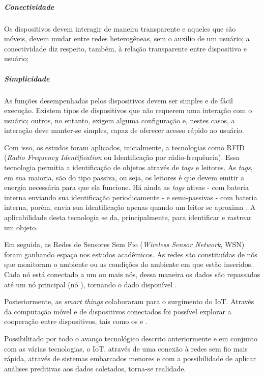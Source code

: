 \subparagraph{Conectividade} 

Os dispositivos devem interagir de maneira transparente
e aqueles que são móveis, devem mudar entre redes heterogêneas, sem o 
auxílio de um usuário; a conectividade diz respeito, também, à relação 
transparente entre dispositivo e usuário; 

\subparagraph{Simplicidade} 

As funções desempenhadas pelos dispositivos devem ser
simples e de fácil execução. Existem tipos de dispositivos que não requerem 
uma interação com o usuário; outros, no entanto, exigem alguma configuração e,
nestes casos, a interação deve manter-se simples, capaz de oferecer acesso
rápido ao usuário. 

Com isso, os estudos foram aplicados, inicialmente, a tecnologias como RFID
(\textit{Radio Frequency Identification} ou Identificação por
rádio-frequência).  Essa tecnologia permitia a identificação de objetos através
de \textit{tags} e leitores. As \textit{tags}, em sua maioria, são do tipo
passiva, ou seja, os leitores é que devem emitir a energia necessária para que
ela funcione. Há ainda as \textit{tags} ativas - com bateria interna enviando
sua identificação periodicamente - e semi-passivas - com bateria interna,
porém, envia sua identificação apenas quando um leitor se aproxima
\cite{want2006introduction}. A aplicabilidade desta tecnologia se da, 
principalmente, para identificar e rastrear um objeto.


Em seguida, as Redes de Sensores Sem Fio (\textit{Wireless Sensor Network}, WSN)
foram ganhando espaço nos estudos acadêmicos. As redes são constituídas de nós
que monitoram o ambiente ou as condições do ambiente em que estão inseridos.
Cada nó está conectado a um ou mais nós, dessa maneira os dados são repassados
até um nó principal (nó \gateway), tornando o dado disponível
\cite{lewis2004wireless}.

Posteriormente, as \textit{smart things} colaboraram para o surgimento do IoT.
Através da computação móvel e de dispositivos conectados foi possível explorar
a cooperação entre dispositivos, tais como os \smartphones[] e \smartwatches.

Possibilitado por todo o avanço tecnológico descrito anteriormente e em
conjunto com as várias tecnologias, o IoT, através de uma conexão à redes sem
fio mais rápida, através de sistemas embarcados menores e com a possibilidade
de aplicar análises preditivas aos dados coletados, torna-se realidade.

